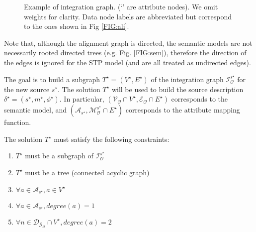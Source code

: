 \documentclass[letterpaper]{article} %
\begin{document}
\begin{figure}[ht]
\caption{Example of integration graph. (`' are attribute nodes). We omit weights for clarity. Data node labels are 
abbreviated but 
correspond to the ones shown in Fig \ref{FIG:ali}.}
\label{FIG:inte}
\end{figure}

Note that, although the alignment graph is directed, the semantic models are 
not necessarily rooted directed trees (e.g. Fig. \ref{FIG:sem}), therefore the 
direction of the edges is ignored for the STP model (and are all treated as 
undirected edges). 

The goal is to build a subgraph $T^\star= (V^\star, E^\star)$ 
of the integration graph 
$\mathcal{I}_\mathcal{O}^{s^\star}$ for the new source $s^\star$. The solution 
$T^\star$ will 
be used to build the source description $\delta^\star = (s^\star, m^\star, 
\phi^\star)$. 
In particular, $(\mathcal{V_O} \cap V^\star,\mathcal{E_O} \cap E^\star)$ 
corresponds to the semantic model, and 
$(\mathcal{A}_{s^\star},\mathcal{M}_\mathcal{O}^{s^\star} \cap E^\star)$ 
corresponds to 
the attribute mapping function.

The solution $T^\star$ must satisfy the following constraints:
\begin{enumerate}
	\item $T^\star$ must be a subgraph of $\mathcal{I}_\mathcal{O}^{s^\star}$
	\item $T^\star$ must be a tree (connected acyclic graph)
	\item $\forall a \in \mathcal{A}_{s^\star}, a\in V^\star$
	\item $\forall a \in \mathcal{A}_{s^\star}, degree(a) = 1$
	\item $\forall n \in \mathcal{D_{G_O}} \cap V^\star, 
	degree(a) = 2$
\end{enumerate}
\end{document}
